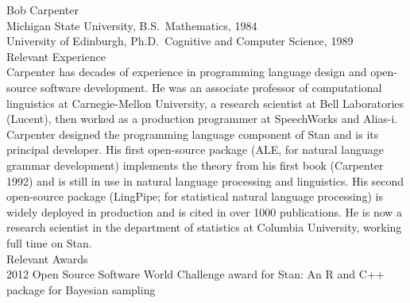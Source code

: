 \documentclass[11pt]{nih2016}
\begin{document}
\vspace*{12pt}

\noindent
{\sc Bob Carpenter}
\\[2pt]
Michigan State University, B.S.\ Mathematics, 1984
\\
University of Edinburgh, Ph.D.\ Cognitive and Computer Science, 1989
\\

\noindent
{\sc Relevant Experience}
\\[3pt]
Carpenter has decades of experience in programming language design and
open-source software development.  He was an associate professor of
computational linguistics at Carnegie-Mellon University, a research
scientist at Bell Laboratories (Lucent), then worked as a production
programmer at SpeechWorks and Alias-i.  Carpenter designed the
programming language component of Stan and is its principal developer.
His first open-source package (ALE, for natural language grammar
development) implements the theory from his first book (Carpenter
1992) and is still in use in natural language processing and
linguistics.  His second open-source package (LingPipe; for
statistical natural language processing) is widely deployed in
production and is cited in over 1000 publications.  He is now a
research scientist in the department of statistics at Columbia
University, working full time on Stan.
\\

\noindent
{\sc Relevant Awards}
\\[2pt]
2012 Open Source Software World Challenge award for Stan: An R and C++
package for Bayesian sampling

\vspace*{12pt}
\end{document}
